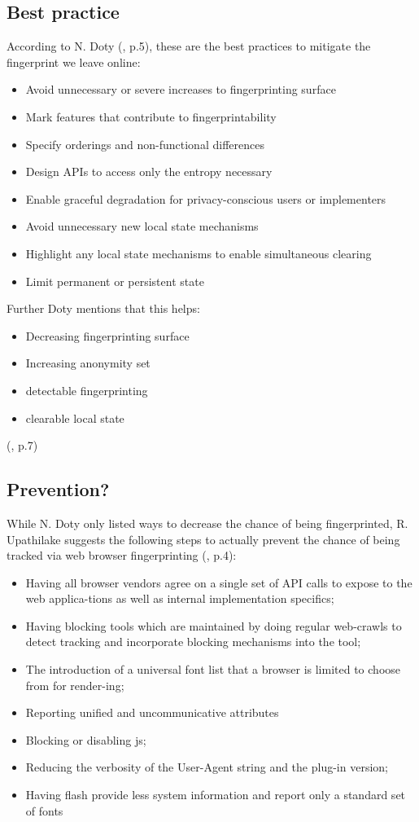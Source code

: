  \subsection{Best practice}
According to N. Doty (\textcite{doty18}, p.5), these are the best practices to mitigate the fingerprint we leave online: 
\begin{itemize}
	\item Avoid unnecessary or severe increases to fingerprinting surface
	\item Mark features that contribute to fingerprintability
	\item Specify orderings and non-functional differences
	\item Design APIs to access only the entropy necessary
	\item Enable graceful degradation for privacy-conscious users or implementers
	\item Avoid unnecessary new local state mechanisms
	\item Highlight any local state mechanisms to enable simultaneous clearing
	\item Limit permanent or persistent state\\
\end{itemize}
Further Doty mentions that this helps: 
\begin{itemize}
	\item Decreasing fingerprinting surface
	\item Increasing anonymity set
	\item detectable fingerprinting
	\item clearable local state
\end{itemize}
(\textcite{doty18}, p.7)\\

\subsection{Prevention?}
While N. Doty only listed ways to decrease the chance of being fingerprinted, R. Upathilake suggests the following steps to actually prevent the chance of being tracked via web browser fingerprinting (\textcite{upi15}, p.4):
\begin{itemize}
	\item Having all browser vendors agree on a single set of API calls to expose to the web applica-tions as well as internal implementation specifics;
	\item Having blocking tools which are maintained by doing regular web-crawls to detect tracking and incorporate blocking mechanisms into the tool;
	\item The introduction of a universal font list that a browser is limited to choose from for render-ing;
	\item Reporting unified and uncommunicative attributes
	\item Blocking or disabling js;
	\item Reducing the verbosity of the User-Agent string and the plug-in version;
	\item 	Having flash provide less system information and report only a standard set of fonts \\
\end{itemize}

